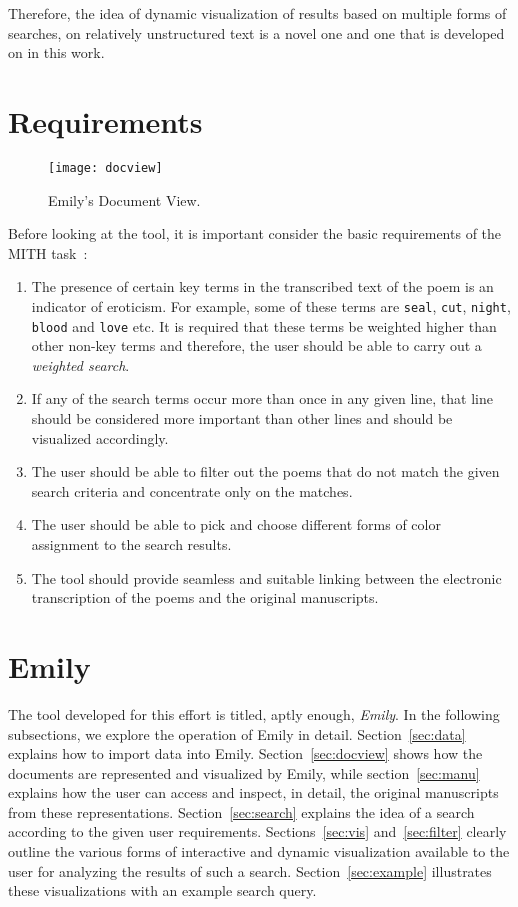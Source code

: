 \documentclass[10pt, twocolumn]{article}
\begin{document}
Therefore, the idea of dynamic visualization of results based on multiple forms of searches,  on relatively unstructured text is a novel one and one that is developed on in this work.  
\section{Requirements}\label{sec:req}
\begin{figure*}
\begin{center}
\texttt{[image: docview]} 
\end{center}
\caption{Emily's Document View.} \label{fig:docview}
\end{figure*}
Before looking at the tool, it is important consider the basic requirements of the MITH task~: 
\begin{enumerate}
  \item The presence of certain key terms in the transcribed text of the poem is an indicator of eroticism. For example, some of these terms are \texttt{seal}, \texttt{cut}, \texttt{night}, \texttt{blood} and \texttt{love} etc. It is required that these terms be weighted higher than other non-key terms and therefore, the user should be able to carry out a \textit{weighted search}.  
  \item If any of the search terms occur more than once in any given line, that line should be considered more important than other lines and should be visualized accordingly. 
  \item The user should be able to filter out the poems that do not match the given search criteria and concentrate only on the matches. 
  \item The user should be able to pick and choose different forms of color assignment to the search results. 
  \item The tool should provide seamless and suitable linking between the electronic transcription of the poems and the original manuscripts. 
\end{enumerate}
\section{Emily}\label{sec:tool}
The tool developed for this effort is titled, aptly enough, \textit{Emily}. In the following subsections, we explore the operation of Emily in detail. Section~\ref{sec:data} explains how to import data into Emily. Section~\ref{sec:docview} shows how the documents are represented and visualized by Emily, while section~\ref{sec:manu} explains how the user can access and inspect, in detail, the original manuscripts from these representations. Section~\ref{sec:search} explains the idea of a search according to the given user requirements. Sections~\ref{sec:vis} and~\ref{sec:filter} clearly outline the various forms of interactive and dynamic visualization available to the user for analyzing the results of such a search. Section~\ref{sec:example} illustrates these visualizations with an example search query. 
\end{document}
